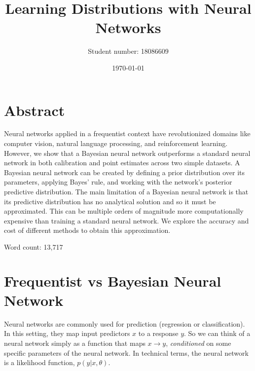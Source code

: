 \documentclass[12pt]{article}
\title{Learning Distributions with Neural Networks}
\author{Student number: 18086609}
\date{\today}
\begin{document}
\maketitle

\vfill

\section{Abstract}
Neural networks applied in a frequentist context have revolutionized domains like computer vision, natural language processing, and reinforcement learning. However, we show that a Bayesian neural network outperforms a standard neural network in both calibration and point estimates across two simple datasets. A Bayesian neural network can be created by defining a prior distribution over its parameters, applying Bayes' rule, and working with the network's posterior predictive distribution.  The main limitation of a Bayesian neural network is that its predictive distribution has no analytical solution and so it must be approximated. This can be multiple orders of magnitude more computationally expensive than training a standard neural network. We explore the accuracy and cost of different methods to obtain this approximation.

\vfill

{\centering Word count: 13,717\par}

\vspace{2cm}
\newpage

\tableofcontents

\section{Frequentist vs Bayesian Neural Network}
\label{sec_nn_vs_bnn}

Neural networks are commonly used for prediction (regression or classification). In this setting, they map input predictors $x$ to a response $y$. So we can think of a neural network simply as a function that maps $x \rightarrow y$, \textit{conditioned} on some specific parameters of the neural network. In technical terms, the neural network is a likelihood function, $p(y | x, \theta)$.
\end{document}
